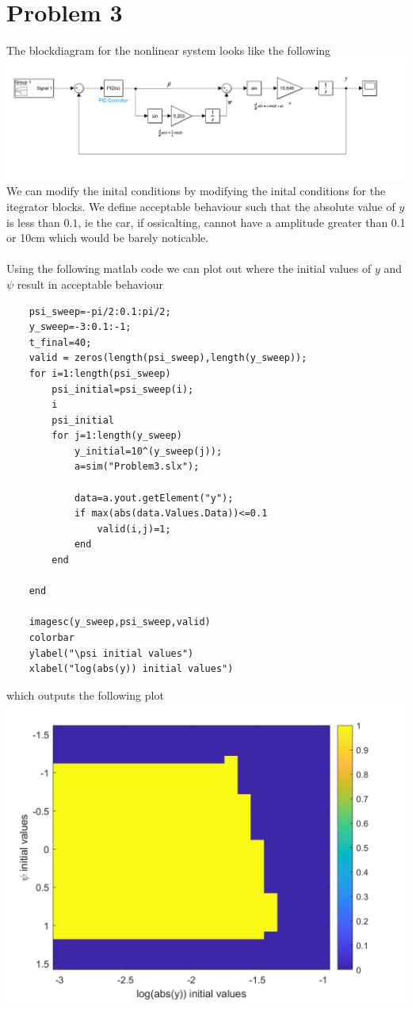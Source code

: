 \documentclass[12pt]{article}
\begin{document}
\section*{Problem 3}
The blockdiagram for the nonlinear system looks like the following\\
\includegraphics[scale=0.4]{Problem3BlockDiagram.PNG}\\
We can modify the inital conditions by modifying the inital conditions for the itegrator blocks. We define acceptable behaviour such that the absolute value of $y$ is less than
$0.1$, ie the car, if ossicalting, cannot have a amplitude greater than 0.1 or 10cm which would be barely noticable.
\\\\
Using the following matlab code we can plot out where the initial values of $y$ and $\psi$ result in acceptable behaviour
\begin{verbatim}
    psi_sweep=-pi/2:0.1:pi/2;
    y_sweep=-3:0.1:-1;
    t_final=40;
    valid = zeros(length(psi_sweep),length(y_sweep));
    for i=1:length(psi_sweep)
        psi_initial=psi_sweep(i);
        i
        psi_initial
        for j=1:length(y_sweep)
            y_initial=10^(y_sweep(j));
            a=sim("Problem3.slx");
    
            data=a.yout.getElement("y");
            if max(abs(data.Values.Data))<=0.1
                valid(i,j)=1;
            end
        end
    
    end
    
    imagesc(y_sweep,psi_sweep,valid)
    colorbar
    ylabel("\psi initial values")
    xlabel("log(abs(y)) initial values")
\end{verbatim}
which outputs the following plot\\
\includegraphics[scale=0.4]{Problem3Fig1.png}\\
\end{document}

